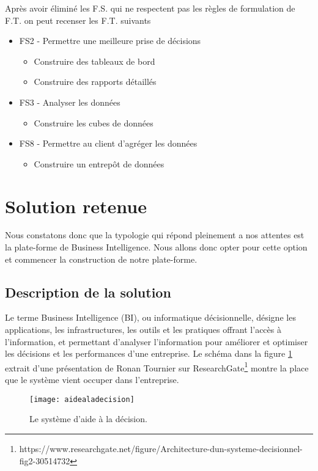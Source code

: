 Après avoir éliminé les F.S. qui ne respectent pas les règles de formulation de F.T. on peut recenser les F.T. suivants
\begin{itemize}
    \item FS2 - Permettre une meilleure prise de décisions 
    \begin{itemize}
        \item Construire des tableaux de bord
        \item Construire des rapports détaillés
    \end{itemize}
    \item FS3 - Analyser les données
    \begin{itemize}
        \item Construire les cubes de données 
    \end{itemize}
    \item FS8 - Permettre au client d’agréger les données
    \begin{itemize}
        \item Construire un entrepôt de données
    \end{itemize}
\end{itemize}


\section{Solution retenue}
Nous constatons donc que la typologie qui répond pleinement a nos attentes est la plate-forme de Business Intelligence. Nous allons donc opter pour cette option et commencer la construction de notre plate-forme.

\subsection{Description de la solution}
Le terme Business Intelligence (BI), ou informatique décisionnelle, désigne les applications, les infrastructures, les outils et les pratiques offrant l’accès à l’information, et permettant d’analyser l’information pour améliorer et optimiser les décisions et les performances d’une entreprise. Le schéma dans la figure \ref{fig:aidealadecision} extrait d'une présentation de Ronan Tournier sur ResearchGate\footnote{https://www.researchgate.net/figure/Architecture-dun-systeme-decisionnel-fig2-30514732} montre la place que le système vient occuper dans l'entreprise.

\begin{figure}[H]
    \centering
    \texttt{[image: aidealadecision]}
    \caption{Le système d'aide à la décision.}
    \label{fig:aidealadecision}
\end{figure}

